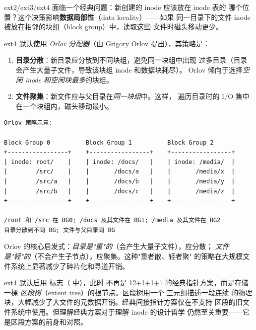\begin{filesystemlayout}

ext2/ext3/ext4 面临一个经典问题：新创建的 inode 应该放在 inode 表的
哪个位置？这个决策影响\textbf{数据局部性}（data locality）——如果
同一目录下的文件 inode 被放在相邻的块组（block group）中，读取这些
文件时磁头移动更少。

ext4 默认使用 \emph{Orlov 分配器}（由 Grigory Orlov 提出），其策略是：

\begin{enumerate}\tightlist
\item \textbf{目录分散}：新目录应分散到不同块组，避免同一块组中出现
  过多目录（目录会产生大量子文件，导致该块组 inode 和数据块耗尽）。
  Orlov 倾向于选择\emph{空闲 inode 和空闲块最多}的块组。
\item \textbf{文件聚集}：新文件应与父目录在\emph{同一块组}中。这样，
  遍历目录时的 I/O 集中在一个块组内，磁头移动最小。
\end{enumerate}

\begin{lstlisting}
Orlov 策略示意:

Block Group 0          Block Group 1          Block Group 2
+-----------------+    +-----------------+    +-----------------+
| inode: root/    |    | inode: /docs/   |    | inode: /media/  |
|        /src/    |    |       /docs/a   |    |       /media/x  |
|        /src/a   |    |       /docs/b   |    |       /media/y  |
|        /src/b   |    |       /docs/c   |    |       /media/z  |
+-----------------+    +-----------------+    +-----------------+

/root 和 /src 在 BG0; /docs 及其文件在 BG1; /media 及其文件在 BG2
目录分散到不同 BG; 文件与父目录同 BG
\end{lstlisting}

Orlov 的核心启发式：\emph{目录是"重"的}（会产生大量子文件），应分散；
\emph{文件是"轻"的}（不会产生子节点），应聚集。这种"重者散、轻者聚"
的策略在大规模文件系统上显著减少了碎片化和寻道开销。

\begin{warningbox}
ext4 默认启用  标志（ 中），此时
 不再是 12+1+1+1 的经典指针方案，而是存储一棵
\emph{区段树}（extent tree）的根节点。区段树用一个
 三元组描述一段连续
的物理块，大幅减少了大文件的元数据开销。经典间接指针方案仅在不支持
区段的旧文件系统中使用。但理解经典方案对于理解 inode 的设计哲学
仍然至关重要——它是区段方案的前身和对照。
\end{warningbox}


\end{filesystemlayout}

